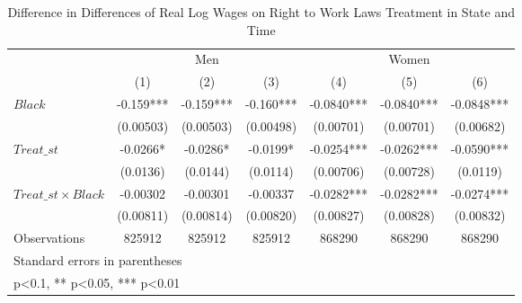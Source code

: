 \begin{table}[htbp]\centering
\def\sym#1{\ifmmode^{#1}\else\(^{#1}\)\fi}
\caption{Difference in Differences of Real Log Wages on Right to Work Laws Treatment in State and Time}
\begin{tabular}{l*{6}{c}}
\hline\hline
                    &\multicolumn{3}{c}{Men}                        &\multicolumn{3}{c}{Women}                      \\\cmidrule(lr){2-4}\cmidrule(lr){5-7}
                    &\multicolumn{1}{c}{(1)}   &\multicolumn{1}{c}{(2)}   &\multicolumn{1}{c}{(3)}   &\multicolumn{1}{c}{(4)}   &\multicolumn{1}{c}{(5)}   &\multicolumn{1}{c}{(6)}   \\
\hline
$ Black $           &      -0.159***&      -0.159***&      -0.160***&     -0.0840***&     -0.0840***&     -0.0848***\\
                    &   (0.00503)   &   (0.00503)   &   (0.00498)   &   (0.00701)   &   (0.00701)   &   (0.00682)   \\
[1em]
$ Treat\_{st} $      &     -0.0266*  &     -0.0286*  &     -0.0199*  &     -0.0254***&     -0.0262***&     -0.0590***\\
                    &    (0.0136)   &    (0.0144)   &    (0.0114)   &   (0.00706)   &   (0.00728)   &    (0.0119)   \\
[1em]
$ Treat\_{st} \times Black $&    -0.00302   &    -0.00301   &    -0.00337   &     -0.0282***&     -0.0282***&     -0.0274***\\
                    &   (0.00811)   &   (0.00814)   &   (0.00820)   &   (0.00827)   &   (0.00828)   &   (0.00832)   \\
\hline
Observations        &      825912   &      825912   &      825912   &      868290   &      868290   &      868290   \\
\hline\hline
\multicolumn{7}{l}{\footnotesize Standard errors in parentheses}\\
\multicolumn{7}{l}{\footnotesize * p<0.1, ** p<0.05, *** p<0.01}\\
\end{tabular}
\end{table}
